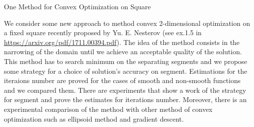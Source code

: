 \documentclass[12pt]{article}
\begin{document}
\begin{center}
\large{One Method for Convex Optimization on Square}\\
\end{center}
\bigskip 

We consider some new approach to method convex 2-dimensional optimization on a fixed square recently proposed by Yu. E. Nesterov (see ex.1.5 in \href{https://arxiv.org/pdf/1711.00394.pdf}{https://arxiv.org/pdf/1711.00394.pdf}). The idea of the method consists in the narrowing of the domain until we achieve an acceptable quality of the solution. This method has to search minimum on the separating segments and we propose some strategy for a choice of solution's accuracy on segment. Estimations for the iteraions number are proved for the cases of smooth and non-smooth functions and we compared them. There are experiments that show a work of the strategy for segment and prove the estimates for iterations number. Moreover, there is an experimental comparison of the method with other method of convex optimization such as ellipsoid method and gradient descent.
\end{document}
